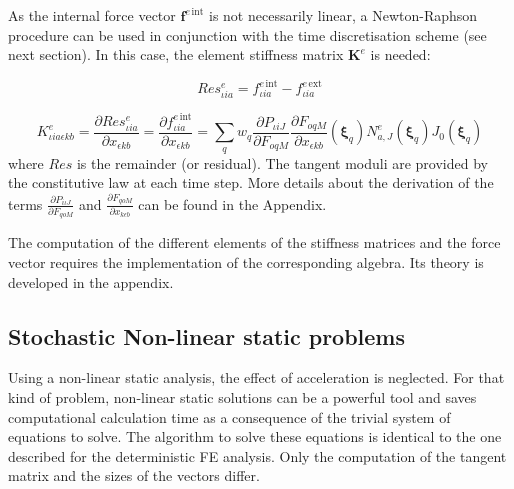 \documentclass[oneside,11pt,times]{book}
\newcommand\omicron{o}
\begin{document}
As the internal force vector $\bm{f}^{e\,\text{int}}$ is not necessarily linear, a Newton-Raphson procedure can be used in conjunction with the time discretisation scheme (see next section). In this case, the element stiffness matrix $\bm{K}^e$ is needed:

\begin{equation}
\label{eq:ReseiaSt}
Res_{\iota i a}^e = f_{\iota i a}^{e\,\text{int}} - f_{\iota i a}^{e\,\text{ext}}
\end{equation}

\begin{equation}
\label{eq:KeiakbSt}
K_{\iota ia\epsilon kb}^e = \frac{\partial Res_{ \iota i a}^e}{\partial x_{ \epsilon k b}}= \frac{\partial f_{ \iota i a}^{e\,\text{int}}}{\partial x_{ \epsilon k b}}= \sum_q w_q  \frac{\partial P_{ \iota i J}}{\partial F_{ \omicron q M}} \frac{\partial F_{ \omicron q M}}{\partial x_{ \epsilon k b}}(\bm{\xi}_q) N^e_{a,J}(\bm{\xi}_q)  J_0(\bm{\xi}_q)
\end{equation}
where $Res$ is the remainder (or residual). The tangent moduli are provided by the constitutive law at each time step. More details about the derivation of the terms $\frac{\partial P_{i \iota J}}{\partial F_{q \omicron M}}$ and $\frac{\partial F_{q \omicron M}}{\partial x_{k \epsilon b}}$ can be found in the Appendix.

The computation of the different elements of the stiffness matrices and the force vector requires the implementation of the corresponding algebra. Its theory is developed in the appendix.

\subsection[Stochastic static problems]{Stochastic Non-linear static problems}
Using a non-linear static analysis, the effect of acceleration is neglected. For that kind of problem, non-linear static solutions can be a powerful tool and saves computational calculation time as a consequence of the trivial system of equations to solve. The algorithm to solve these equations is identical to the one described for the deterministic FE analysis. Only the computation of the tangent matrix and the sizes of the vectors differ.
\end{document}
